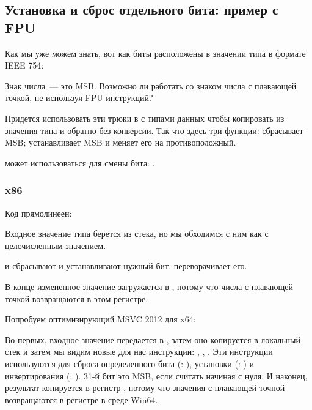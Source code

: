 \subsection{Установка и сброс отдельного бита: пример с \ac{FPU}}

Как мы уже можем знать, вот как биты расположены в значении типа \Tfloat в формате IEEE 754:



Знак числа~--- это \ac{MSB}. 
Возможно ли работать со знаком числа с плавающей точкой, не используя FPU-инструкций?



Придется использовать эти трюки в \CCpp с типами данных чтобы копировать из значения типа \Tfloat и обратно
без конверсии.
Так что здесь три функции:  сбрасывает \ac{MSB};  устанавливает \ac{MSB} и 
 меняет его на противоположный.

\XOR может использоваться для смены бита: .

\subsubsection{x86}

Код прямолинеен:



Входное значение типа \Tfloat берется из стека, но мы обходимся с ним как с целочисленным значением.

\AND и \OR сбрасывают и устанавливают нужный бит.
\XOR переворачивает его.

В конце измененное значение загружается в , потому что числа с плавающей точкой возвращаются в этом регистре.

Попробуем оптимизирующий MSVC 2012 для x64:



Во-первых, входное значение передается в , затем оно копируется в локальный стек и затем мы видим
новые для нас инструкции: \BTR, \BTS, \BTC.
Эти инструкции используются для сброса определенного бита (\BTR: ), 
установки (\BTS: ) и инвертирования (\BTC: ).
31-й бит это \ac{MSB}, если считать начиная с нуля.
И наконец, результат копируется в регистр , потому что значения с плавающей точной возвращаются
в регистре  в среде Win64.

